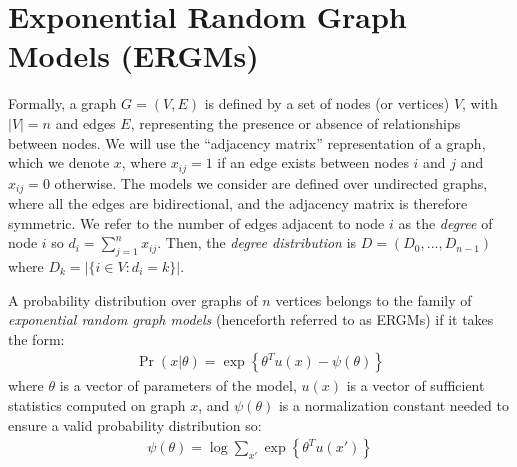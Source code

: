 \section{Exponential Random Graph Models (ERGMs)}\label{sec:ergms}

Formally, a graph $G = (V,E)$ is defined by a set of nodes (or vertices) $V$, with $|V| = n$ and edges $E$, representing the presence or absence of relationships between nodes. We will use the ``adjacency matrix'' representation of a graph, which we denote $x$, where $x_{ij} = 1$ if an edge exists between nodes $i$ and $j$ and $x_{ij} = 0$ otherwise.  The models we consider are defined over undirected graphs, where all the edges are bidirectional, and the adjacency matrix is therefore symmetric. We refer to the number of edges adjacent to node $i$ as the \emph{degree} of node $i$ so $d_i = \sum_{j=1}^{n} x_{ij}$. Then, the \emph{degree distribution} is $D = (D_0,...,D_{n-1})$ where $D_k = |\{i \in V : d_i = k \}|$.

\begin{definition}
\label{def:ergm_defn}
A probability distribution over graphs of $n$ vertices belongs to the family of \emph{exponential random graph models} (henceforth referred to as ERGMs) if it takes the form:
\begin{align*}
\Pr(x | \theta) = \exp\left\{\theta^T u(x) - \psi(\theta)  \right\}
\end{align*}
where $\theta$ is a vector of parameters of the model, $u(x)$ is a vector of sufficient statistics computed on graph $x$, and $\psi(\theta)$ is a normalization constant needed to ensure a valid probability distribution so:
\begin{align*}
\psi(\theta) = \log \sum_{x'} \exp\left\{\theta^T u(x') \right\}
\end{align*}
\end{definition}

 
